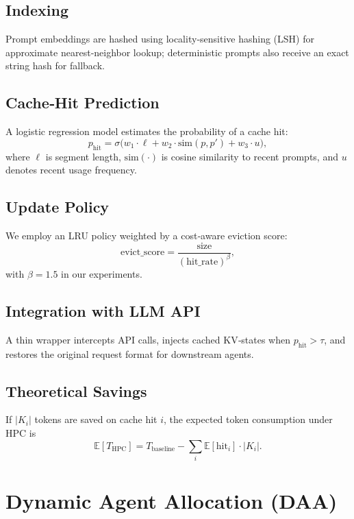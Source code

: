 \documentclass[conference]{IEEEtran}
\begin{document}
\subsection{Indexing}
Prompt embeddings are hashed using locality‑sensitive hashing (LSH) for approximate nearest‑neighbor lookup; deterministic prompts also receive an exact string hash for fallback.

\subsection{Cache‑Hit Prediction}
A logistic regression model estimates the probability of a cache hit:
\begin{equation}
p_{\text{hit}} = \sigma\!\big( w_1 \cdot \ell + w_2 \cdot \text{sim}(p,p') + w_3 \cdot u \big),
\end{equation}
where $\ell$ is segment length, $\text{sim}(\cdot)$ is cosine similarity to recent prompts, and $u$ denotes recent usage frequency.

\subsection{Update Policy}
We employ an LRU policy weighted by a cost‑aware eviction score:
\begin{equation}
\text{evict\_score} = \frac{\text{size}}{(\text{hit\_rate})^{\beta}},
\end{equation}
with $\beta=1.5$ in our experiments.

\subsection{Integration with LLM API}
A thin wrapper intercepts API calls, injects cached KV‑states when $p_{\text{hit}} > \tau$, and restores the original request format for downstream agents.

\subsection{Theoretical Savings}
If $|K_i|$ tokens are saved on cache hit $i$, the expected token consumption under HPC is
\begin{equation}
\mathbb{E}[T_{\text{HPC}}] = T_{\text{baseline}} - \sum_{i} \mathbb{E}[\text{hit}_i]\cdot |K_i|.
\end{equation}

\section{Dynamic Agent Allocation (DAA)}
\end{document}
